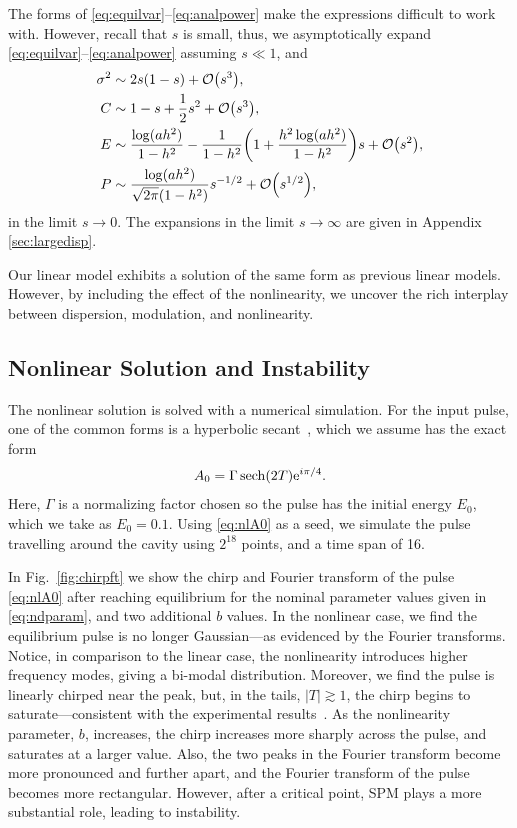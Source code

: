 \documentclass[9pt,twocolumn,twoside]{osajnl}
\let\originalleft\left
\let\originalright\right
\renewcommand{\left}{\mathopen{}\mathclose\bgroup\originalleft}
\renewcommand{\right}{\aftergroup\egroup\originalright}
\providecommand{\bigO}[1]{\ensuremath{\mathop{}\mathopen{}\mathcal{O}\mathopen{}\left(#1\right)}} %
\DeclareMathOperator{\sech}{sech}
\begin{document}
The forms of \eqref{eq:equilvar}--\eqref{eq:analpower} make the expressions difficult to work with. However, recall that $s$ is small, thus, we asymptotically expand \eqref{eq:equilvar}--\eqref{eq:analpower} assuming $s \ll 1$, and
\begin{align}
	\sigma^2 &\sim 2s(1 - s) + \bigO{s^3}, \\
	C &\sim 1 - s + \frac{1}{2}s^2 + \bigO{s^3}, \\
	E &\sim \frac{\log (a h^2)}{1 - h^2} - \frac{1}{1 - h^2} \left( 1 + \frac{h^2 \log(a h^2)}{1 - h^2}  \right) s + \bigO{s^2}, \label{eq:maxenergy} \\
	P &\sim \frac{\log(ah^2)}{\sqrt{2 \pi}(1 - h^2)} s^{-1/2} + \bigO{s^{1/2}},
\end{align}
in the limit $s \rightarrow 0$. The expansions in the limit $s \rightarrow \infty$ are given in Appendix \ref{sec:largedisp}.

Our linear model exhibits a solution of the same form as previous linear models. However, by including the effect of the nonlinearity, we uncover the rich interplay between dispersion, modulation, and nonlinearity.

\subsection{Nonlinear Solution and Instability}
\label{sec:nlresults}
The nonlinear solution is solved with a numerical simulation. For the input pulse, one of the common forms is a hyperbolic secant~\cite{coen1997, finot2008, rothenberg1989b, tomlinson1984}, which we assume has the exact form
\begin{align}
	A_0 = \Gamma \sech \left( 2 T \right) \textrm{e}^{i \pi / 4}.
	\label{eq:nlA0}
\end{align}
Here, $\Gamma$ is a normalizing factor chosen so the pulse has the initial energy $E_0$, which we take as $E_0 = 0.1$. Using \eqref{eq:nlA0} as a seed, we simulate the pulse travelling around the cavity using $2^{18}$ points, and a time span of 16.

In Fig.~\ref{fig:chirpft} we show the chirp and Fourier transform of the pulse \eqref{eq:nlA0} after reaching equilibrium for the nominal parameter values given in \eqref{eq:ndparam}, and two additional $b$ values. In the nonlinear case, we find the equilibrium pulse is no longer Gaussian---as evidenced by the Fourier transforms. Notice, in comparison to the linear case, the nonlinearity introduces higher frequency modes, giving a bi-modal distribution. Moreover, we find the pulse is linearly chirped near the peak, but, in the tails, $|T| \gtrsim 1$, the chirp begins to saturate---consistent with the experimental results~\cite{chen2008, rothenberg1989b, tomlinson1985}. As the nonlinearity parameter, $b$, increases, the chirp increases more sharply across the pulse, and saturates at a larger value. Also, the two peaks in the Fourier transform become more pronounced and further apart, and the Fourier transform of the pulse becomes more rectangular. However, after a critical point, SPM plays a more substantial role, leading to instability.
\end{document}

